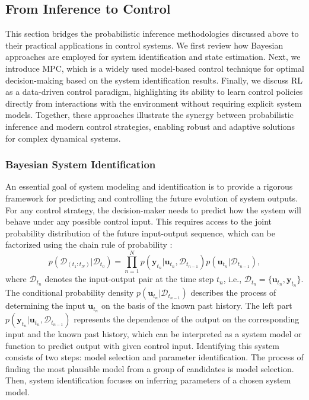 \subsection{From Inference to Control}
This section bridges the probabilistic inference methodologies discussed above to their practical applications in control systems. We first review how Bayesian approaches are employed for system identification and state estimation. Next, we introduce \acf{MPC}, which is a widely used model-based control technique for optimal decision-making based on the system identification results. Finally, we discuss \acf{RL} as a data-driven control paradigm, highlighting its ability to learn control policies directly from interactions with the environment without requiring explicit system models. Together, these approaches illustrate the synergy between probabilistic inference and modern control strategies, enabling robust and adaptive solutions for complex dynamical systems.

\subsubsection{Bayesian System Identification}
An essential goal of system modeling and identification is to provide a rigorous framework for predicting and controlling the future evolution of system outputs. For any control strategy, the decision-maker needs to predict how the system will behave under any possible control input. This requires access to the joint probability distribution of the future input-output sequence, which can be factorized using the chain rule of probability \citep{BayesSysId1981}:
\begin{equation}
    p(\mathcal{D}_{(t_1:t_N)}|\mathcal{D}_{t_0})=\prod _{n=1}^{N}p(\boldsymbol{y}_{t_n}|\boldsymbol{u}_{t_n}, \mathcal{D}_{t_{n-1}})p(\boldsymbol{u}_{t_n}|\mathcal{D}_{t_{n-1}}),
\end{equation}
where $\mathcal{D}_{t_n}$ denotes the input-output pair at the time step $t_n$, i.e., $\mathcal{D}_{t_n}=\{\boldsymbol{u}_{t_n}, \boldsymbol{y}_{t_n}\}$.
The conditional probability density $p(\boldsymbol{u}_{t_n}|\mathcal{D}_{t_{n-1}})$ describes the process of determining the input $\boldsymbol{u}_{t_n}$ on the basis of the known past history. The left part $p(\boldsymbol{y}_{t_n}|\boldsymbol{u}_{t_n}, \mathcal{D}_{t_{n-1}})$ represents the dependence of the output on the corresponding input and the known past history, which can be interpreted as a system model or function to predict output with given control input. Identifying this system consists of two steps: model selection and parameter identification. The process of finding the most plausible model from a group of candidates is model selection. Then, system identification focuses on inferring parameters of a chosen system model.
